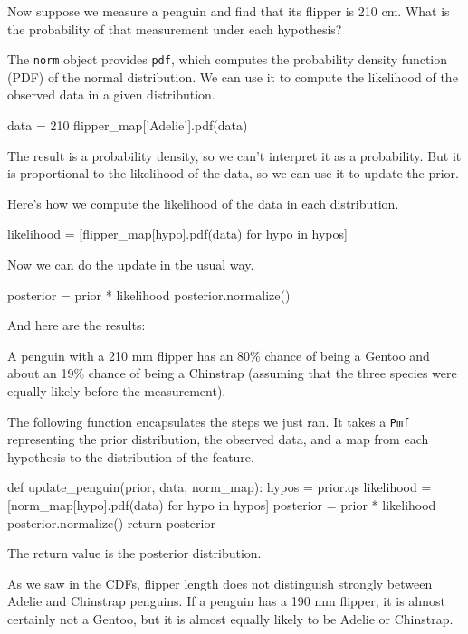 \documentclass[12pt]{book}
\theoremstyle{exercise}
\newcommand{\py}[1]{{\tt #1}}%
\begin{document}
Now suppose we measure a penguin and find that its flipper is 210 cm.
What is the probability of that measurement under each hypothesis?

The \py{norm} object provides
\py{pdf}, which computes the probability density
function (PDF) of the normal distribution. We can use it to compute the
likelihood of the observed data in a given distribution.

\begin{code}
data = 210
flipper_map['Adelie'].pdf(data)
\end{code}

The result is a probability density, so we can't interpret it as a
probability. But it is proportional to the likelihood of the data, so we
can use it to update the prior.

Here's how we compute the likelihood of the data in each distribution.

\begin{code}
likelihood = [flipper_map[hypo].pdf(data) for hypo in hypos]
\end{code}

Now we can do the update in the usual way.

\begin{code}
posterior = prior * likelihood
posterior.normalize()
\end{code}

And here are the results:



A penguin with a 210 mm flipper has an 80\% chance of being a Gentoo and
about an 19\% chance of being a Chinstrap (assuming that the three
species were equally likely before the measurement).

The following function encapsulates the steps we just ran. It takes a
\py{Pmf} representing the prior distribution, the
observed data, and a map from each hypothesis to the distribution of the
feature.

\begin{code}
def update_penguin(prior, data, norm_map):
    hypos = prior.qs
    likelihood = [norm_map[hypo].pdf(data) for hypo in hypos]
    posterior = prior * likelihood
    posterior.normalize()
    return posterior
\end{code}

The return value is the posterior distribution.

As we saw in the CDFs, flipper length does not distinguish strongly
between Adelie and Chinstrap penguins. If a penguin has a 190 mm
flipper, it is almost certainly not a Gentoo, but it is almost equally
likely to be Adelie or Chinstrap.
\end{document}
